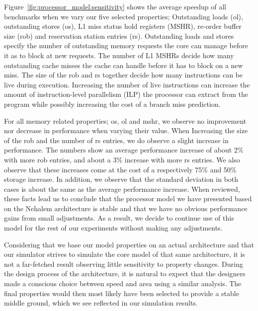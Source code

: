 Figure~\ref{fig:processor_model:sensitivity} shows the average speedup of all benchmarks when we vary our five selected properties; Outstanding loads (ol), outstanding stores (os), L1 miss status hold registers (MSHR), re-order buffer size (rob) and reservation station entries (rs).
Outstanding loads and stores specify the number of outstanding memory requests the core can manage before it as to block at new requests.
The number of L1 MSHRs decide how many outstanding cache misses the cache can handle before it has to block on a new miss.
The size of the rob and rs together decide how many instructions can be live during execution.  
Increasing the number of live instructions can increase the amount of instruction-level parallelism (ILP) the processor can extract from the program while possibly increasing the cost of a branch miss prediction.

For all memory related properties; os, ol and mshr, we observe no improvement nor decrease in performance when varying their value.
When Increasing the size of the rob and the number of rs entries, we do observe a slight increase in performance.
The numbers show an average performance increase of about 2\% with more rob entries, and about a 3\% increase with more rs entries.
We also observe that these increases come at the cost of a respectively 75\% and 50\% storage increase.
In addition, we observe that the standard deviation in both cases is about the same as the average performance increase.
When reviewed, these facts lead us to conclude that the processor model we have presented based on the Nehalem architecture is stable and that we have no obvious performance gains from small adjustments.
As a result, we decide to continue use of this model for the rest of our experiments without making any adjustments.

Considering that we base our model properties on an actual architecture and that our simulator strives to simulate the core model of that same architecture, it is not a far-fetched result observing little sensitivity to property changes.
During the design process of the architecture, it is natural to expect that the designers made a conscious choice between speed and area using a similar analysis.
The final properties would then most likely have been selected to provide a stable middle ground, which we see reflected in our simulation results.